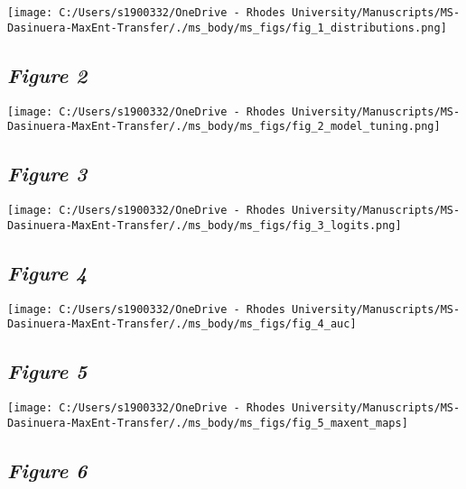 \documentclass[12pt,]{article}
\begin{document}
\texttt{[image: C:/Users/s1900332/OneDrive - Rhodes University/Manuscripts/MS-Dasinuera-MaxEnt-Transfer/./ms\_body/ms\_figs/fig\_1\_distributions.png]}

\newpage

\hypertarget{figure-2}{%
\subsection{\texorpdfstring{\emph{Figure 2}}{Figure 2}}\label{figure-2}}

\texttt{[image: C:/Users/s1900332/OneDrive - Rhodes University/Manuscripts/MS-Dasinuera-MaxEnt-Transfer/./ms\_body/ms\_figs/fig\_2\_model\_tuning.png]}

\newpage

\hypertarget{figure-3}{%
\subsection{\texorpdfstring{\emph{Figure 3}}{Figure 3}}\label{figure-3}}

\texttt{[image: C:/Users/s1900332/OneDrive - Rhodes University/Manuscripts/MS-Dasinuera-MaxEnt-Transfer/./ms\_body/ms\_figs/fig\_3\_logits.png]}

\newpage

\hypertarget{figure-4}{%
\subsection{\texorpdfstring{\emph{Figure 4}}{Figure 4}}\label{figure-4}}

\texttt{[image: C:/Users/s1900332/OneDrive - Rhodes University/Manuscripts/MS-Dasinuera-MaxEnt-Transfer/./ms\_body/ms\_figs/fig\_4\_auc]}

\newpage

\hypertarget{figure-5}{%
\subsection{\texorpdfstring{\emph{Figure 5}}{Figure 5}}\label{figure-5}}

\texttt{[image: C:/Users/s1900332/OneDrive - Rhodes University/Manuscripts/MS-Dasinuera-MaxEnt-Transfer/./ms\_body/ms\_figs/fig\_5\_maxent\_maps]}

\newpage

\hypertarget{figure-6}{%
\subsection{\texorpdfstring{\emph{Figure 6}}{Figure 6}}\label{figure-6}}
\end{document}
